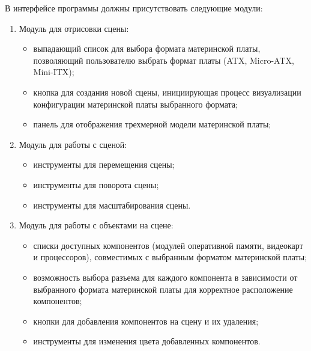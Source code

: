 В интерфейсе программы должны присутствовать следующие модули:
\begin{enumerate}[label=\arabic*)]
	\item Модуль для отрисовки сцены:
	\begin{itemize}[label=---]
		\item выпадающий список для выбора формата материнской платы, позволяющий пользователю выбрать формат платы (ATX, Micro-ATX, Mini-ITX);
		\item кнопка для создания новой сцены, инициирующая процесс визуализации конфигурации  материнской платы выбранного формата;
		\item панель для отображения трехмерной модели материнской платы;
	\end{itemize}
	\item Модуль для работы с сценой:
	\begin{itemize}[label=---]
		\item инструменты для перемещения сцены;
		\item инструменты для поворота сцены;
		\item инструменты для масштабирования сцены.
	\end{itemize}
	\item Модуль для работы с объектами на сцене:
	\begin{itemize}[label=---]
		\item списки доступных компонентов (модулей оперативной памяти, видеокарт и процессоров), совместимых с выбранным форматом материнской платы;
		\item возможность выбора разъема для каждого компонента в зависимости от выбранного формата материнской платы для корректное расположение компонентов;
		\item кнопки для добавления компонентов на сцену и их удаления;
		\item инструменты для изменения цвета добавленных компонентов.
	\end{itemize}
\end{enumerate}

